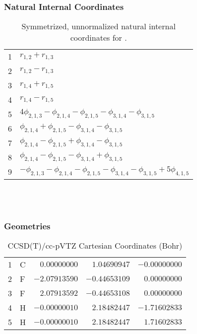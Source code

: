 \documentclass[10pt,oneside]{article}
\begin{document}
\subsubsection*{Natural Internal Coordinates}
\begin{table}[h!]
\centering
\caption{Symmetrized, unnormalized natural internal coordinates for .}
\small
\begin{tabular}{ll}
  1   & $r_{1,2} + r_{1,3}$ \\
  2   & $r_{1,2} - r_{1,3}$ \\
  3   & $r_{1,4} + r_{1,5}$ \\
  4   & $r_{1,4} - r_{1,5}$ \\
  5   & $4\phi_{2,1,3} - \phi_{2,1,4} - \phi_{2,1,5} - \phi_{3,1,4} - \phi_{3,1,5}$ \\
  6   & $\phi_{2,1,4} + \phi_{2,1,5} - \phi_{3,1,4} - \phi_{3,1,5}$ \\
  7   & $\phi_{2,1,4} - \phi_{2,1,5} + \phi_{3,1,4} - \phi_{3,1,5}$ \\
  8   & $\phi_{2,1,4} - \phi_{2,1,5} - \phi_{3,1,4} + \phi_{3,1,5}$ \\
  9   & $-\phi_{2,1,3} - \phi_{2,1,4} - \phi_{2,1,5} - \phi_{3,1,4} - \phi_{3,1,5} + 5\phi_{4,1,5}$ \\
\end{tabular}
\end{table}

\clearpage

\subsection{\ \ \ }

\subsubsection*{Geometries}
\begin{table}[h!]
\centering
\caption{CCSD(T)/cc-pVTZ Cartesian Coordinates (Bohr)}
\begin{tabular}{llrrr}
1  & C  & $ 0.00000000$ & $ 1.04690947$ & $-0.00000000$ \\
2  & F  & $-2.07913590$ & $-0.44653109$ & $ 0.00000000$ \\
3  & F  & $ 2.07913592$ & $-0.44653108$ & $ 0.00000000$ \\
4  & H  & $-0.00000010$ & $ 2.18482447$ & $-1.71602833$ \\
5  & H  & $-0.00000010$ & $ 2.18482447$ & $ 1.71602833$ \\
\end{tabular}
\end{table}
\end{document}
